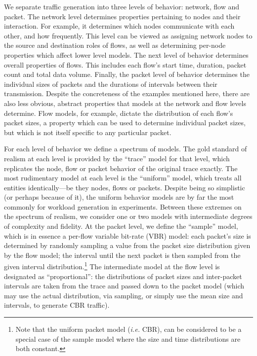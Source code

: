 \documentclass[conference]{IEEEtran}
\newcommand{\caps}[1]{{\small{#1}}}
\begin{document}
We separate traffic generation into three levels of behavior: network, flow and packet. The {network} level determines properties pertaining to nodes and their interaction. For example, it determines which nodes communicate with each other, and how frequently. This level can be viewed as assigning network nodes to the source and destination roles of flows, as well as determining per-node properties which affect lower level models. The next level of behavior determines overall properties of flows. This includes each flow's start time, duration, packet count and total data volume. Finally, the packet level of behavior determines the individual sizes of packets and the durations of intervals between their transmission. Despite the concreteness of the examples mentioned here, there are also less obvious, abstract properties that models at the network and flow levels determine. Flow models, for example, dictate the distribution of each flow's packet sizes, a property which can be used to determine individual packet sizes, but which is not itself specific to any particular packet.



For each level of behavior we define a spectrum of models. The gold standard of realism at each level is provided by the ``trace'' model for that level, which replicates the node, flow or packet behavior of the original trace exactly. The most rudimentary model at each level is the ``uniform'' model, which treats all entities identically---be they nodes, flows or packets. Despite being so simplistic (or perhaps because of it), the uniform behavior models are by far the most commonly for workload generation in experiments. Between these extremes on the spectrum of realism, we consider one or two models with intermediate degrees of complexity and fidelity. At the packet level, we define the ``sample'' model, which is in essence a per-flow variable bit-rate (\caps{VBR}) model: each packet's size is determined by randomly sampling a value from the packet size distribution given by the flow model; the interval until the next packet is then sampled from the given interval distribution.\footnote{Note that the uniform packet model (\textit{i.e.} {\scriptsize{CBR}}), can be considered to be a special case of the sample model where the size and time distributions are both constant.} The intermediate model at the flow level is designated as ``proportional'': the distributions of packet sizes and inter-packet intervals are taken from the trace and passed down to the packet model (which may use the actual distribution, via sampling, or simply use the mean size and intervals, to generate \caps{CBR} traffic).
\end{document}
